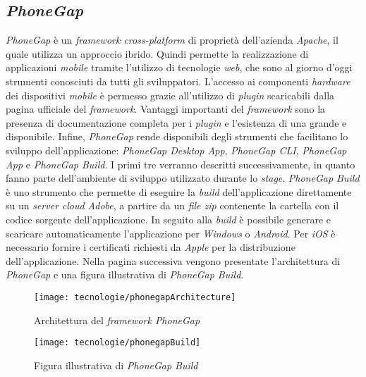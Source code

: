 \subsection{\textit{PhoneGap}}

\textit{PhoneGap} è un \textit{framework cross-platform} di proprietà dell'azienda \textit{Apache}, il quale utilizza un approccio ibrido. Quindi permette la realizzazione di applicazioni \textit{mobile} tramite l'utilizzo di tecnologie \textit{web}, che sono al giorno d'oggi strumenti conosciuti da tutti gli sviluppatori. L'accesso ai componenti \textit{hardware} dei dispositivi \textit{mobile} è permesso grazie all'utilizzo di \textit{plugin} scaricabili dalla pagina ufficiale del \textit{framework}. Vantaggi importanti del \textit{framework} sono la presenza di documentazione completa per i \textit{plugin} e l'esistenza di una  grande e disponibile. Infine, \textit{PhoneGap} rende disponibili degli strumenti che facilitano lo sviluppo dell'applicazione: \textit{PhoneGap Desktop App}, \textit{PhoneGap CLI}, \textit{PhoneGap App} e \textit{PhoneGap Build}. I primi tre verranno descritti successivamente, in quanto fanno parte dell'ambiente di sviluppo utilizzato durante lo \textit{stage}. \textit{PhoneGap Build} è uno strumento che permette di eseguire la \textit{build} dell'applicazione direttamente su un \textit{server} \textit{cloud Adobe}, a partire da un \textit{file zip} contenente la cartella con il codice sorgente dell'applicazione. In seguito alla \textit{build} è possibile generare e scaricare automaticamente l'applicazione per \textit{Windows} o \textit{Android}. Per \textit{iOS} è necessario fornire i certificati richiesti da \textit{Apple} per la distribuzione dell'applicazione. Nella pagina successiva vengono presentate l'architettura di \textit{PhoneGap} e una figura illustrativa di \textit{PhoneGap Build}.

\begin{figure}[!h] 
    \centering 
    \texttt{[image: tecnologie/phonegapArchitecture]} 
    \caption{Architettura del \textit{framework PhoneGap}}
\end{figure}

\begin{figure}[!h] 
    \centering 
    \texttt{[image: tecnologie/phonegapBuild]} 
    \caption{Figura illustrativa di \textit{PhoneGap Build}}
\end{figure}

\newpage



